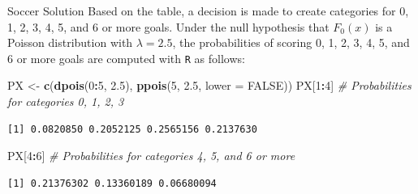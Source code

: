 \documentclass[
  ignorenonframetext,
]{beamer}
\newenvironment{Shaded}{\begin{snugshade}}{\end{snugshade}}
\newcommand{\AttributeTok}[1]{\textcolor[rgb]{0.13,0.29,0.53}{#1}}
\newcommand{\CommentTok}[1]{\textcolor[rgb]{0.56,0.35,0.01}{\textit{#1}}}
\newcommand{\ConstantTok}[1]{\textcolor[rgb]{0.56,0.35,0.01}{#1}}
\newcommand{\DecValTok}[1]{\textcolor[rgb]{0.00,0.00,0.81}{#1}}
\newcommand{\FloatTok}[1]{\textcolor[rgb]{0.00,0.00,0.81}{#1}}
\newcommand{\FunctionTok}[1]{\textcolor[rgb]{0.13,0.29,0.53}{\textbf{#1}}}
\newcommand{\NormalTok}[1]{#1}
\newcommand{\OtherTok}[1]{\textcolor[rgb]{0.56,0.35,0.01}{#1}}
\newcommand{\SpecialCharTok}[1]{\textcolor[rgb]{0.81,0.36,0.00}{\textbf{#1}}}
\begin{document}
\begin{frame}[fragile]{Soccer Solution}
\protect\hypertarget{soccer-solution-1}{}
Based on the table, a decision is made to create categories for 0, 1, 2,
3, 4, 5, and 6 or more goals. Under the null hypothesis that \(F_0(x)\)
is a Poisson distribution with \(\lambda=2.5\), the probabilities of
scoring 0, 1, 2, 3, 4, 5, and 6 or more goals are computed with
\texttt{R} as follows:

\begin{Shaded}
\begin{Highlighting}[]
\NormalTok{PX }\OtherTok{\textless{}{-}} \FunctionTok{c}\NormalTok{(}\FunctionTok{dpois}\NormalTok{(}\DecValTok{0}\SpecialCharTok{:}\DecValTok{5}\NormalTok{, }\FloatTok{2.5}\NormalTok{), }\FunctionTok{ppois}\NormalTok{(}\DecValTok{5}\NormalTok{, }\FloatTok{2.5}\NormalTok{, }\AttributeTok{lower =} \ConstantTok{FALSE}\NormalTok{))}
\NormalTok{PX[}\DecValTok{1}\SpecialCharTok{:}\DecValTok{4}\NormalTok{] }\CommentTok{\# Probabilities for categories 0, 1, 2, 3}
\end{Highlighting}
\end{Shaded}

\begin{verbatim}
[1] 0.0820850 0.2052125 0.2565156 0.2137630
\end{verbatim}

\begin{Shaded}
\begin{Highlighting}[]
\NormalTok{PX[}\DecValTok{4}\SpecialCharTok{:}\DecValTok{6}\NormalTok{] }\CommentTok{\# Probabilities for categories 4, 5, and 6 or more}
\end{Highlighting}
\end{Shaded}

\begin{verbatim}
[1] 0.21376302 0.13360189 0.06680094
\end{verbatim}
\end{frame}
\end{document}
